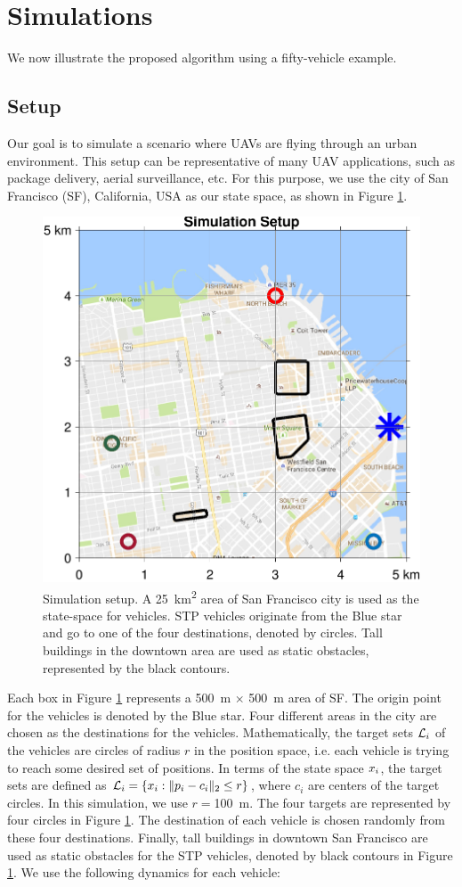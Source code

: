 \section{Simulations \label{sec:simulations}}
We now illustrate the proposed algorithm using a fifty-vehicle example. 

\subsection{Setup \label{sec:simSetup}}
Our goal is to simulate a scenario where UAVs are flying through an urban environment. This setup can be representative of many UAV applications, such as package delivery, aerial surveillance, etc. For this purpose, we use the city of San Francisco (SF), California, USA as our state space, as shown in Figure \ref{fig:sf_setup}. 
\begin{figure}
  \centering
  \includegraphics[width=0.8\columnwidth]{"figs/sf_setup"}
  \caption{Simulation setup. A \SI{25}{\km\squared} area of San Francisco city is used as the state-space for vehicles. STP vehicles originate from the Blue star and go to one of the four destinations, denoted by circles. Tall buildings in the downtown area are used as static obstacles, represented by the black contours.}
  \label{fig:sf_setup}
\end{figure}
Each box in Figure \ref{fig:sf_setup} represents a \SI{500}{\m} $\times$ \SI{500}{\m} area of SF. The origin point for the vehicles is denoted by the Blue star. Four different areas in the city are chosen as the destinations for the vehicles. Mathematically, the target sets $\mathcal{L}_i$ of the vehicles are circles of radius $r$ in the position space, i.e. each vehicle is trying to reach some desired set of positions. In terms of the state space $x_i$, the target sets are defined as $\mathcal{L}_i = \{x_i: \|p_i - c_i\|_2 \le r\}$, where $c_i$ are centers of the target circles. In this simulation, we use $r = $\SI{100}{\m}. The four targets are represented by four circles in Figure \ref{fig:sf_setup}. The destination of each vehicle is chosen randomly from these four destinations. Finally, tall buildings in downtown San Francisco are used as static obstacles for the STP vehicles, denoted by black contours in Figure \ref{fig:sf_setup}. We use the following dynamics for each vehicle:
